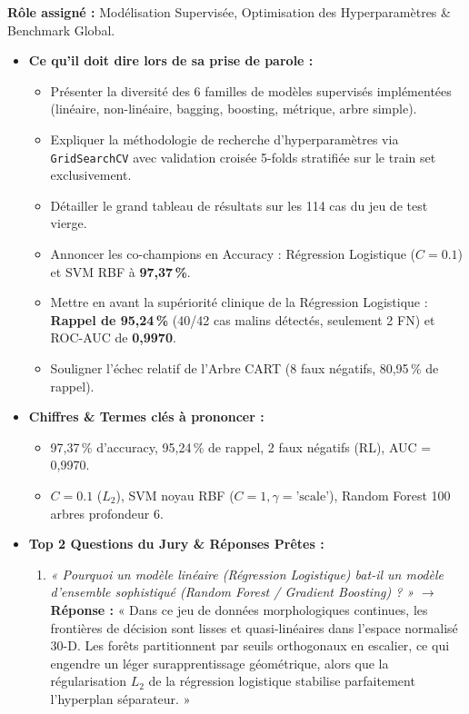 \documentclass[10pt,a4paper]{article}
\begin{document}
\begin{tcolorbox}[memberbox, title={3. Yassir BOUITA (Master M2SI) -- Slides 6 et 7 (~2 min)}]
\textbf{Rôle assigné :} Modélisation Supervisée, Optimisation des Hyperparamètres \& Benchmark Global.
\begin{itemize}[leftmargin=0.5cm, itemsep=2pt]
	\item \textbf{Ce qu'il doit dire lors de sa prise de parole :}
	\begin{itemize}
		\item Présenter la diversité des 6 familles de modèles supervisés implémentées (linéaire, non-linéaire, bagging, boosting, métrique, arbre simple).
		\item Expliquer la méthodologie de recherche d'hyperparamètres via \texttt{GridSearchCV} avec validation croisée 5-folds stratifiée sur le train set exclusivement.
		\item Détailler le grand tableau de résultats sur les 114 cas du jeu de test vierge.
		\item Annoncer les co-champions en Accuracy : Régression Logistique ($C=0.1$) et SVM RBF à \textbf{97,37\,\%}.
		\item Mettre en avant la supériorité clinique de la Régression Logistique : \textbf{Rappel de 95,24\,\%} (40/42 cas malins détectés, seulement 2 FN) et ROC-AUC de \textbf{0,9970}.
		\item Souligner l'échec relatif de l'Arbre CART (8 faux négatifs, 80,95\,\% de rappel).
	\end{itemize}
	\item \textbf{Chiffres \& Termes clés à prononcer :}
	\begin{itemize}
		\item 97,37\,\% d'accuracy, 95,24\,\% de rappel, 2 faux négatifs (RL), AUC = 0,9970.
		\item $C=0.1$ ($L_2$), SVM noyau RBF ($C=1, \gamma=\text{'scale'}$), Random Forest 100 arbres profondeur 6.
	\end{itemize}
	\item \textbf{Top 2 Questions du Jury \& Réponses Prêtes :}
	\begin{enumerate}
		\item \textit{« Pourquoi un modèle linéaire (Régression Logistique) bat-il un modèle d'ensemble sophistiqué (Random Forest / Gradient Boosting) ? »}  
		$\rightarrow$ \textbf{Réponse :} « Dans ce jeu de données morphologiques continues, les frontières de décision sont lisses et quasi-linéaires dans l'espace normalisé 30-D. Les forêts partitionnent par seuils orthogonaux en escalier, ce qui engendre un léger surapprentissage géométrique, alors que la régularisation $L_2$ de la régression logistique stabilise parfaitement l'hyperplan séparateur. »

\end{enumerate}
\end{itemize}
\end{tcolorbox}
\end{document}
